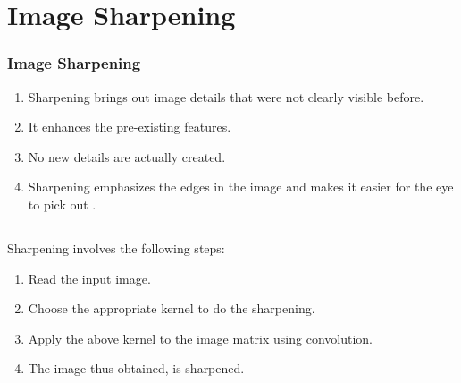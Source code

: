 \documentclass[12pt]{beamer}
\begin{document}
\section{Image Sharpening}
\begin{frame}[c]
\frametitle{Image Sharpening}
\begin{enumerate}
\item \vskip-30pt Sharpening brings out image details that were not clearly visible before.
\item It enhances the pre-existing features.
\item No new details are actually created.
\item Sharpening emphasizes the edges in the image and makes it easier for the eye to pick out . 
\end{enumerate}
\end{frame}


\subsection{}
\begin{frame}[c]
\frametitle{}
\vskip-30pt
Sharpening involves the following steps:\\
\begin{enumerate}
\item Read the input image.
\item Choose the appropriate kernel to do the sharpening.
\item Apply the above kernel to the image matrix using convolution.
\item The image thus obtained, is sharpened.
\end{enumerate}
\end{frame}
\end{document}
